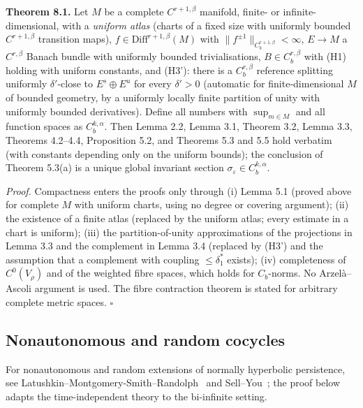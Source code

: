 \documentclass[11pt,a4paper]{article}
\theoremstyle{plain}
\theoremstyle{definition}
\theoremstyle{remark}
\numberwithin{equation}{section}
\numberwithin{figure}{section}
\begin{document}
\textbf{Theorem 8.1.} Let $M$ be a complete $C^{r+1,\beta}$ manifold, finite- or infinite-dimensional, with a \textit{uniform atlas} (charts of a fixed size with uniformly bounded $C^{r+1,\beta}$ transition maps), $f\in\mathrm{Diff}^{r+1,\beta}(M)$ with $\|f^{\pm1}\|_{C^{r+1,\beta}_b}<\infty$, $E\to M$ a $C^{r,\beta}$ Banach bundle with uniformly bounded trivialisations, $B\in C^{r,\beta}_b$ with (H1) holding with uniform constants, and (H3'): there is a $C^{r,\beta}_b$ reference splitting uniformly $\delta'$-close to $E^s\oplus E^u$ for every $\delta'>0$ (automatic for finite-dimensional $M$ of bounded geometry, by a uniformly locally finite partition of unity with uniformly bounded derivatives). Define all numbers with $\sup_{m\in M}$ and all function spaces as $C^{k,\alpha}_b$. Then Lemma 2.2, Lemma 3.1, Theorem 3.2, Lemma 3.3, Theorems 4.2–4.4, Proposition 5.2, and Theorems 5.3 and 5.5 hold verbatim (with constants depending only on the uniform bounds); the conclusion of Theorem 5.3(a) is a unique global invariant section $\sigma_\varepsilon\in C^{k,\alpha}_b$.

\textit{Proof.} Compactness enters the proofs only through (i) Lemma 5.1 (proved above for complete $M$ with uniform charts, using no degree or covering argument); (ii) the existence of a finite atlas (replaced by the uniform atlas; every estimate in a chart is uniform); (iii) the partition-of-unity approximations of the projections in Lemma 3.3 and the complement in Lemma 3.4 (replaced by (H3') and the assumption that a complement with coupling $\le\delta_1^*$ exists); (iv) completeness of $C^0(V_\rho)$ and of the weighted fibre spaces, which holds for $C_b$-norms. No Arzelà–Ascoli argument is used. The fibre contraction theorem is stated for arbitrary complete metric spaces. $\square$

\subsection{Nonautonomous and random cocycles}

For nonautonomous and random extensions of normally hyperbolic persistence, see Latushkin–Montgomery-Smith–Randolph~\cite{lat1996} and Sell–You~\cite{sell2002}; the proof below adapts the time-independent theory to the bi-infinite setting.
\end{document}
